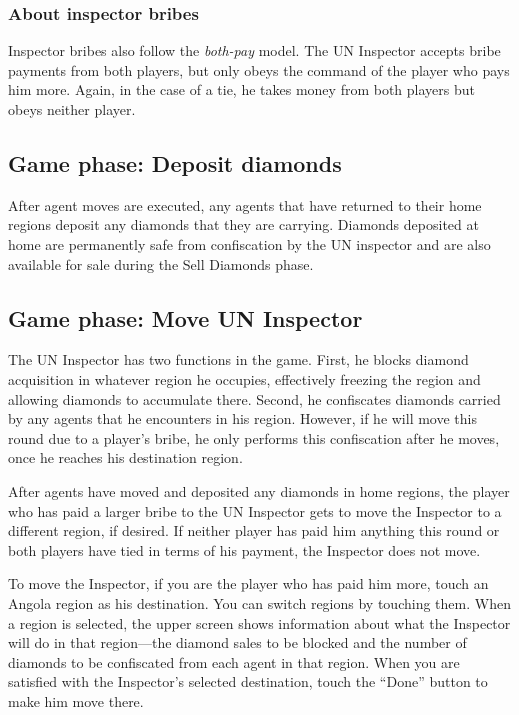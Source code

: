 \documentclass[8pt]{extbook}
\begin{document}
\subsubsection{About inspector bribes}
Inspector bribes also follow the {\it both-pay} model.  The UN Inspector accepts bribe payments from both players, but only obeys the command of the player who pays him more.  Again, in the case of a tie, he takes money from both players but obeys neither player.

\subsection{Game phase:  Deposit diamonds}
After agent moves are executed, any agents that have returned to their home regions deposit any diamonds that they are carrying.  Diamonds deposited at home are permanently safe from confiscation by the UN inspector and are also available for sale during the Sell Diamonds phase.

\subsection{Game phase:  Move UN Inspector}

The UN Inspector has two functions in the game.  First, he blocks diamond acquisition in whatever region he occupies, effectively freezing the region and allowing diamonds to accumulate there.  Second, he confiscates diamonds carried by any agents that he encounters in his region.  However, if he will move this round due to a player's bribe, he only performs this confiscation after he moves, once he reaches his destination region.

After agents have moved and deposited any diamonds in home regions, the player who has paid a larger bribe to the UN Inspector gets to move the Inspector to a different region, if desired.  If neither player has paid him anything this round or both players have tied in terms of his payment, the Inspector does not move.

To move the Inspector, if you are the player who has paid him more, touch an Angola region as his destination.  You can switch regions by touching them.  When a region is selected, the upper screen shows information about what the Inspector will do in that region---the diamond sales to be blocked and the number of diamonds to be confiscated from each agent in that region.  When you are satisfied with the Inspector's selected destination, touch the ``Done'' button to make him move there.
\end{document}
